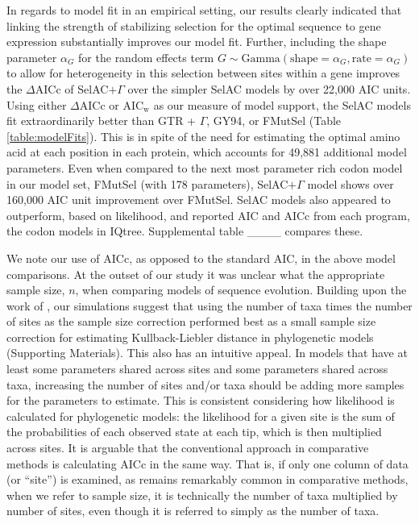 \documentclass[onecolumn,letterpaper,fleqn,nogrid]{myMBE}%
\newcommand{\DeltaAICc}{\ensuremath{\Delta\text{AICc}}\xspace}
\newcommand{\AICw}{\ensuremath{\text{AIC}_\text{w}}\xspace}
\newcommand{\selac}{SelAC\xspace}
\newcommand{\selacplusgamma}{SelAC$+\Gamma$\xspace}
\newcommand{\alphag}{\ensuremath{\alpha_G}\xspace}
\begin{document}
In regards to model fit in an empirical setting, our results clearly indicated that linking the strength of stabilizing selection for the optimal sequence to gene expression substantially improves our model fit.
Further, including the shape parameter \alphag for the random effects term $G \sim \text{Gamma}\left(\text{shape} = \alphag, \text{rate}=\alphag\right)$ to allow for heterogeneity in this selection between sites within a gene improves the \DeltaAICc of \selacplusgamma over the simpler \selac models by over 22,000 AIC units.
Using either \DeltaAICc or \AICw as our measure of model support, the \selac models fit extraordinarily better than GTR + $\Gamma$, GY94, or FMutSel (Table \ref{table:modelFits}).
This is in spite of the need for estimating the optimal amino acid at each position in each protein, which accounts for 49,881 additional model parameters.
Even when compared to the next most parameter rich codon model in our model set, FMutSel (with 178 parameters), \selacplusgamma model shows over 160,000 AIC unit improvement over FMutSel.
\selac models also appeared to outperform, based on likelihood, and reported AIC and AICc from each program, the codon models in IQtree. %
Supplemental table \_\_\_\_ compares these. %

We note our use of AICc, as opposed to the standard AIC, in the above model comparisons.
At the outset of our study it was unclear what the appropriate sample size, $n$, when comparing models of sequence evolution.
Building upon the work of \citet{JhwuengEtAl2014}, our simulations suggest that using the number of taxa times the number of sites as the sample size correction performed best as a small sample size correction for estimating Kullback-Liebler distance in phylogenetic models (Supporting Materials).
This also has an intuitive appeal.
In models that have at least some parameters shared across sites and some parameters shared across taxa, increasing the number of sites and/or taxa should be adding more samples for the parameters to estimate.
This is consistent considering how likelihood is calculated for phylogenetic models: the likelihood for a given site is the sum of the probabilities of each observed state at each tip, which is then multiplied across sites.
It is arguable that the conventional approach in comparative methods is calculating AICc in the same way.
That is, if only one column of data (or ``site'') is examined, as remains remarkably common in comparative methods, when we refer to sample size, it is technically the number of taxa multiplied by number of sites, even though it is referred to simply as the number of taxa.
\end{document}

